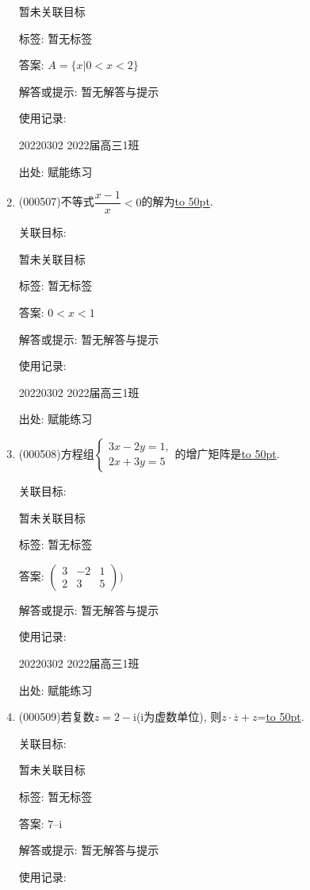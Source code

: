 \documentclass[10pt,a4paper]{article}
\newcommand{\blank}[1]{\underline{\hbox to #1pt{}}}
\begin{document}
\begin{enumerate}[1.]
暂未关联目标



标签: 暂无标签

答案: $A=\{x|0<x<2\}$

解答或提示: 暂无解答与提示

使用记录:

20220302	2022届高三1班	


出处: 赋能练习
\item { (000507)}不等式$\dfrac{x-1}x<0$的解为\blank{50}.


关联目标:

暂未关联目标



标签: 暂无标签

答案: $0<x<1$

解答或提示: 暂无解答与提示

使用记录:

20220302	2022届高三1班	


出处: 赋能练习
\item { (000508)}方程组$\begin{cases} 3x-2y=1, \\ 2x+3y=5 \end{cases}$的增广矩阵是\blank{50}.


关联目标:

暂未关联目标



标签: 暂无标签

答案: $\begin{pmatrix}  3 & -2 & 1 \\ 2 & 3 & 5 \end{pmatrix})$

解答或提示: 暂无解答与提示

使用记录:

20220302	2022届高三1班	


出处: 赋能练习
\item { (000509)}若复数$z=2-\mathrm{i}$($\mathrm{i}$为虚数单位), 则$z\cdot \overline z+z$=\blank{50}.


关联目标:

暂未关联目标



标签: 暂无标签

答案: $7–\mathrm{i}$

解答或提示: 暂无解答与提示

使用记录:


\end{enumerate}
\end{document}
